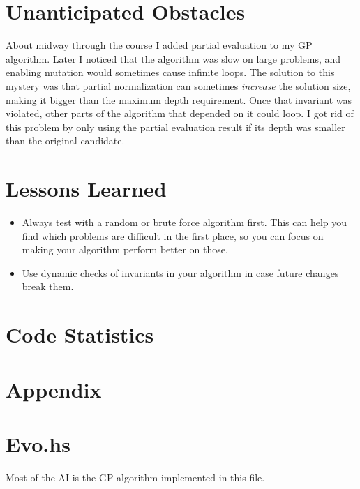 \documentclass{article}
\begin{document}
\section{Unanticipated Obstacles}

About midway through the course I added partial evaluation to my GP
algorithm. Later I noticed that the algorithm was slow on large
problems, and enabling mutation would sometimes cause infinite
loops. The solution to this mystery was that partial normalization can
sometimes \textit{increase} the solution size, making it bigger than
the maximum depth requirement. Once that invariant was violated, other
parts of the algorithm that depended on it could loop. I got rid of
this problem by only using the partial evaluation result if its depth
was smaller than the original candidate.

\section{Lessons Learned}

\begin{itemize}
\item Always test with a random or brute force algorithm first. This can
help you find which problems are difficult in the first place, so you
can focus on making your algorithm perform better on those.
\item Use dynamic checks of invariants in your algorithm in case future
changes break them.
\end{itemize}

\section{Code Statistics}

\section*{Appendix}
\appendix

\section{Evo.hs}

Most of the AI is the GP algorithm implemented in this file.
\end{document}
